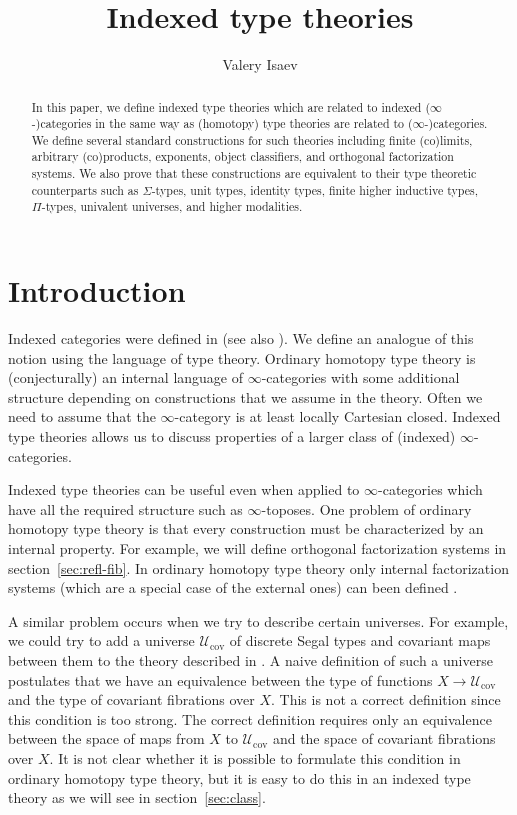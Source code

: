 \documentclass[reqno]{mscs}
\title{Indexed type theories}
\author{Valery Isaev}
\numberwithin{figure}{section}
\begin{document}
\maketitle

\begin{abstract}
In this paper, we define indexed type theories which are related to indexed ($\infty$-)categories in the same way as (homotopy) type theories are related to ($\infty$-)categories.
We define several standard constructions for such theories including finite (co)limits, arbitrary (co)products, exponents, object classifiers, and orthogonal factorization systems.
We also prove that these constructions are equivalent to their type theoretic counterparts such as $\Sigma$-types, unit types, identity types, finite higher inductive types, $\Pi$-types, univalent universes, and higher modalities.
\end{abstract}

\section{Introduction}

Indexed categories were defined in \cite{indexed-cats} (see also \cite[B1]{elephant}).
We define an analogue of this notion using the language of type theory.
Ordinary homotopy type theory is (conjecturally) an internal language of $\infty$-categories with some additional structure depending on constructions that we assume in the theory.
Often we need to assume that the $\infty$-category is at least locally Cartesian closed.
Indexed type theories allows us to discuss properties of a larger class of (indexed) $\infty$-categories.

Indexed type theories can be useful even when applied to $\infty$-categories which have all the required structure such as $\infty$-toposes.
One problem of ordinary homotopy type theory is that every construction must be characterized by an internal property.
For example, we will define orthogonal factorization systems in section~\ref{sec:refl-fib}.
In ordinary homotopy type theory only internal factorization systems (which are a special case of the external ones) can been defined \cite{modality-hott}.

A similar problem occurs when we try to describe certain universes.
For example, we could try to add a universe $\mathcal{U}_\mathrm{cov}$ of discrete Segal types and covariant maps between them to the theory described in \cite{riehl-dhott}.
A naive definition of such a universe postulates that we have an equivalence between the type of functions $X \to \mathcal{U}_\mathrm{cov}$ and the type of covariant fibrations over $X$.
This is not a correct definition since this condition is too strong.
The correct definition requires only an equivalence between the space of maps from $X$ to $\mathcal{U}_\mathrm{cov}$ and the space of covariant fibrations over $X$.
It is not clear whether it is possible to formulate this condition in ordinary homotopy type theory, but it is easy to do this in an indexed type theory as we will see in section~\ref{sec:class}.
\end{document}
